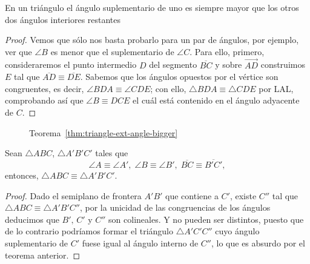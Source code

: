 \documentclass[11pt,a4paper]{book}
\begin{document}
\begin{thm}\label{thm:triangle-ext-angle-bigger}
En un triángulo el ángulo suplementario de uno es siempre mayor que los otros dos ángulos interiores restantes
\end{thm}
\begin{proof}
Vemos que sólo nos basta probarlo para un par de ángulos, por ejemplo, ver que $\angle B$ es menor que el suplementario de $\angle C$. Para ello, primero, consideraremos el punto intermedio $D$ del segmento $\overline{BC}$ y sobre $\overrightarrow{AD}$ construimos $E$ tal que $\overline{AD}\equiv\overline{DE}$. Sabemos que los ángulos opuestos por el vértice son congruentes, es decir, $\angle BDA\equiv\angle CDE$; con ello, $\triangle BDA\equiv\triangle CDE$ por LAL, comprobando así que $\angle B\equiv DCE$ el cuál está contenido en el ángulo adyacente de $C$.
\end{proof}
\begin{figure}
\centering
{}
\caption{Teorema~\ref{thm:triangle-ext-angle-bigger}}
\end{figure}
\begin{thm}
Sean $\triangle ABC$, $\triangle A'B'C'$ tales que
$$\angle A\equiv\angle A',\;\angle B\equiv\angle B',\;\overline{BC}\equiv\overline{B'C'},$$
entonces, $\triangle ABC\equiv\triangle A'B'C'$.
\end{thm}
\begin{proof}
Dado el semiplano de frontera $A'B'$ que contiene a $C'$, existe $C''$ tal que $\triangle ABC\equiv\triangle A'B'C''$, por la unicidad de las congruencias de los ángulos deducimos que $B',\,C'$ y $C''$ son colineales. Y no pueden ser distintos, puesto que de lo contrario podríamos formar el triángulo $\triangle A'C'C''$ cuyo ángulo suplementario de $C'$ fuese igual al ángulo interno de $C''$, lo que es absurdo por el teorema anterior.
\end{proof}
\end{document}
